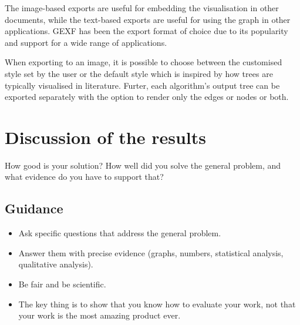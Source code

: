 \documentclass{l4proj}
\begin{document}
The image-based exports are useful for embedding the visualisation in other documents, while the text-based exports are useful for using the graph in other applications. GEXF has been the export format of choice due to its popularity and support for a wide range of applications.

When exporting to an image, it is possible to choose between the customised style set by the user or the default style which is inspired by how trees are typically visualised in literature. Furter, each algorithm's output tree can be exported separately with the option to render only the edges or nodes or both.






\chapter{Discussion of the results}
\label{sec:discussion_results}
How good is your solution? How well did you solve the general problem, and what evidence do you have to support that?

\section{Guidance}
\begin{itemize}
    \item
          Ask specific questions that address the general problem.
    \item
          Answer them with precise evidence (graphs, numbers, statistical
          analysis, qualitative analysis).
    \item
          Be fair and be scientific.
    \item
          The key thing is to show that you know how to evaluate your work, not
          that your work is the most amazing product ever.
\end{itemize}



\end{document}
